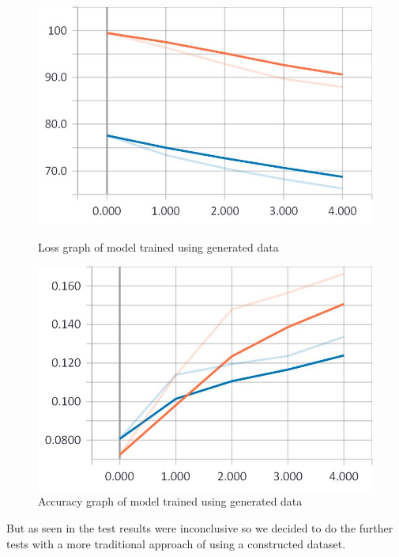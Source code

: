 \begin{figure}
\centering
\begin{minipage}{.5\textwidth}
	\centering
	\includegraphics[width=1\linewidth]{Illustrations/losss1r.jpg}
	\caption{Loss graph of model trained using generated data}
	\label{fig:loss1r}
\end{minipage}%
\begin{minipage}{.5\textwidth}
	\centering
	\includegraphics[width=1\linewidth]{Illustrations/accuracy1r.jpg}
	\caption{Accuracy graph of model trained using generated data}
	\label{fig:accuracy1r}
\end{minipage}
\end{figure}

But as seen in the test results were inconclusive so we decided to do the further tests with a more traditional approach of using a constructed dataset.


